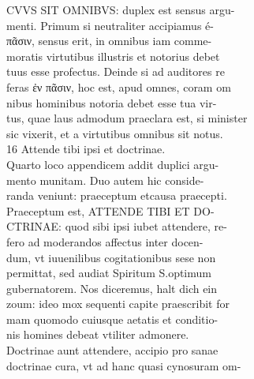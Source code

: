 \documentclass{article}
\begin{document}
\begin{pages}
                CVVS SIT OMNIBVS: duplex est sensus argu- \\
                menti. Primum si neutraliter accipiamus é- \\
                πᾶσιν, sensus erit, in omnibus iam comme- \\
                moratis virtutibus illustris et notorius debet \\
                tuus esse profectus. Deinde si ad auditores re \\
                feras ἐν πᾶσιν, hoc est, apud omnes, coram om \\
                nibus hominibus notoria debet esse tua vir- \\
                tus, quae laus admodum praeclara est, si minister \\
                sic vixerit, et a virtutibus omnibus sit notus. \\
                16 Attende tibi ipsi et doctrinae. \\
                Quarto loco appendicem addit duplici argu- \\
                mento munitam. Duo autem hic conside- \\
                randa veniunt: praeceptum etcausa praecepti. \\
                Praeceptum est, ATTENDE TIBI ET DO- \\
                CTRINAE: quod sibi ipsi iubet attendere, re- \\
                fero ad moderandos affectus inter docen- \\
                dum, vt iuuenilibus cogitationibus sese non \\
                permittat, sed audiat Spiritum S.optimum \\
                gubernatorem. Nos diceremus, halt dich ein \\
                zoum: ideo mox sequenti capite praescribit for \\
                mam quomodo cuiusque aetatis et conditio- \\
                nis homines debeat vtiliter admonere. \\
                Doctrinae aunt attendere, accipio pro sanae \\
                doctrinae cura, vt ad hanc quasi cynosuram om- \\

\end{pages}
\end{document}
